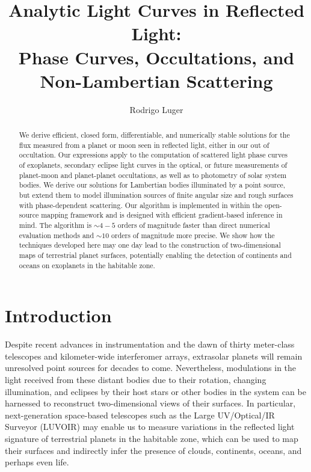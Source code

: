\documentclass[modern]{aastex62}
\begin{document}
\title{%
    Analytic Light Curves in Reflected Light:%
    \\%
    Phase Curves, Occultations, and Non-Lambertian Scattering
}

\author[0000-0002-0296-3826]{Rodrigo Luger}
%


\begin{abstract}
    We derive efficient, closed form, differentiable, and numerically stable
    solutions for the flux measured from a planet or moon seen in reflected
    light, either in our out of occultation.
    Our expressions apply to the computation of scattered
    light phase curves of exoplanets, secondary eclipse light curves in
    the optical, or future measurements of planet-moon and planet-planet
    occultations, as well as to photometry of solar system bodies.
    We derive our solutions for Lambertian bodies illuminated by a point
    source, but extend them to model illumination sources of finite
    angular size and rough surfaces with phase-dependent scattering.
    Our algorithm is implemented in \Python within the open-source
    \starry mapping framework and is designed with efficient gradient-based
    inference in mind.
    The algorithm is ${\sim}4-5$ orders of magnitude faster than direct
    numerical evaluation methods and ${\sim}10$ orders of magnitude more
    precise.
    We show how the techniques developed here may one day lead to the
    construction of two-dimensional maps of terrestrial planet surfaces,
    potentially enabling the detection of continents and oceans on
    exoplanets in the habitable zone.
    \href{https://github.com/rodluger/starrynight}{\color{linkcolor}\faGithub}
\end{abstract}

%
\section{Introduction}
\label{sec:intro}
%

Despite recent advances in instrumentation and the dawn of
thirty meter-class telescopes and kilometer-wide interferomer arrays,
extrasolar planets will remain unresolved point sources for decades
to come. Nevertheless, modulations in the light received from these distant
bodies due to their rotation, changing illumination, and eclipses
by their host stars or other bodies in the system can be harnessed to
reconstruct two-dimensional views of their surfaces.
In particular, next-generation space-based telescopes such as the
Large UV/Optical/IR Surveyor (LUVOIR) may enable us to measure
variations in the reflected light signature of terrestrial planets in
the habitable zone, which can be used to map their surfaces and
indirectly infer the presence of clouds, continents, oceans, and perhaps
even life.
\end{document}
